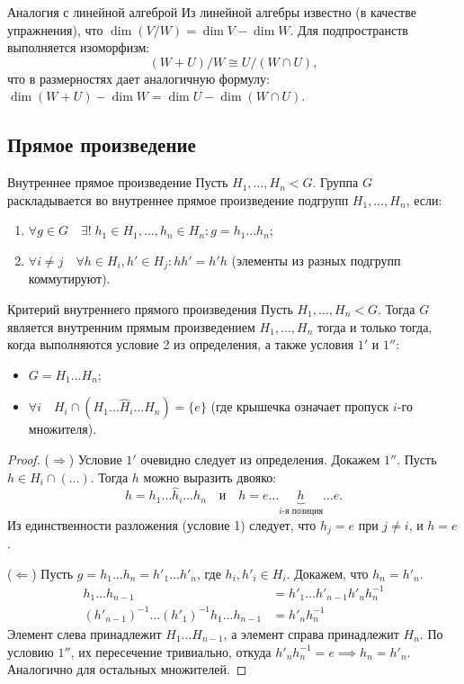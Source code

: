 \begin{Remark}{Аналогия с линейной алгеброй}{}
	Из линейной алгебры известно (в качестве упражнения), что $\dim(V/W) = \dim V - \dim W$.
	Для подпространств выполняется изоморфизм:
	\[
	(W + U)/W \cong U/(W \cap U),
	\]
	что в размерностях дает аналогичную формулу: $\dim(W + U) - \dim W = \dim U - \dim(W \cap U)$.
\end{Remark}

\subsection{Прямое произведение}

\begin{Definition}{Внутреннее прямое произведение}{}
	Пусть $H_1, \dots, H_n < G$. Группа $G$ раскладывается во внутреннее прямое произведение подгрупп $H_1, \dots, H_n$, если:
	\begin{enumerate}
		\item $\forall g \in G \quad \exists! \; h_1 \in H_1, \dots, h_n \in H_n \colon g = h_1 \dots h_n$;
		\item $\forall i \neq j \quad \forall h \in H_i, h' \in H_j \colon hh' = h'h$ (элементы из разных подгрупп коммутируют).
	\end{enumerate}
\end{Definition}

\begin{Proposition}{Критерий внутреннего прямого произведения}{}
	Пусть $H_1, \dots, H_n < G$. Тогда $G$ является внутренним прямым произведением $H_1, \dots, H_n$ тогда и только тогда, когда выполняются условие 2 из определения, а также условия $1'$ и $1''$:
	\begin{itemize}
		\item[$1'$)] $G = H_1 \dots H_n$;
		\item[$1''$)] $\forall i \quad H_i \cap (H_1 \dots \widehat{H}_i \dots H_n) = \{e\}$ (где крышечка означает пропуск $i$-го множителя).
	\end{itemize}
\end{Proposition}

\begin{proof}
	($\Rightarrow$) Условие $1'$ очевидно следует из определения.
	Докажем $1''$. Пусть $h \in H_i \cap (\dots)$. Тогда $h$ можно выразить двояко:
	\[
	h = h_1 \dots \widehat{h}_i \dots h_n \quad \text{и} \quad h = e \dots \underbrace{h}_{i\text{-я позиция}} \dots e.
	\]
	Из единственности разложения (условие 1) следует, что $h_j = e$ при $j \neq i$, и $h = e$.
	
	($\Leftarrow$) Пусть $g = h_1 \dots h_n = h'_1 \dots h'_n$, где $h_i, h'_i \in H_i$. Докажем, что $h_n = h'_n$.
	\begin{align*}
		h_1 \dots h_{n-1} &= h'_1 \dots h'_{n-1} h'_n h_n^{-1} \\
		(h'_{n-1})^{-1} \dots (h'_1)^{-1} h_1 \dots h_{n-1} &= h'_n h_n^{-1}
	\end{align*}
	Элемент слева принадлежит $H_1 \dots H_{n-1}$, а элемент справа принадлежит $H_n$. По условию $1''$, их пересечение тривиально, откуда $h'_n h_n^{-1} = e \implies h_n = h'_n$. Аналогично для остальных множителей.
\end{proof}

